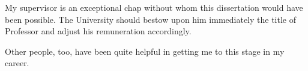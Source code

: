 \begin{acknowledgements}
  My supervisor is an exceptional chap without whom this dissertation
  would have been possible. The University should bestow upon him
  immediately the title of Professor and adjust his remuneration
  accordingly.

  Other people, too, have been quite helpful in getting me to this
  stage in my career.
\end{acknowledgements}
